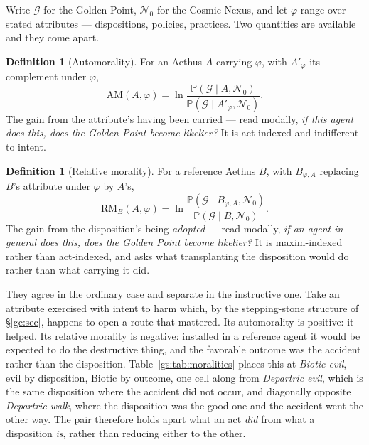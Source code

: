 \documentclass[11pt]{article}
\numberwithin{equation}{section}
\theoremstyle{plain}
\theoremstyle{definition}
\newtheorem{definition}[theorem]{Definition}
\theoremstyle{remark}
\newcommand{\PP}{\mathbb{P}}
\begin{document}
Write $\mathcal G$ for the Golden Point, $\mathcal N_0$ for the Cosmic
Nexus, and let $\varphi$ range over stated attributes --- dispositions,
policies, practices. Two quantities are available and they come apart.

\begin{definition}[Automorality]\label{gs:def:automorality}
For an Aethus $A$ carrying $\varphi$, with $A'_\varphi$ its complement
under $\varphi$,
\begin{equation}\label{gs:eq:am}
\mathrm{AM}(A,\varphi)=
\ln\frac{\PP(\mathcal G\mid A,\mathcal N_0)}
{\PP(\mathcal G\mid A'_\varphi,\mathcal N_0)} .
\end{equation}
The gain from the attribute's having been carried --- read modally,
\emph{if this agent does this, does the Golden Point become likelier?}
It is act-indexed and indifferent to intent.
\end{definition}

\begin{definition}[Relative morality]\label{gs:def:relmorality}
For a reference Aethus $B$, with $B_{\varphi,A}$ replacing $B$'s
attribute under $\varphi$ by $A$'s,
\begin{equation}\label{gs:eq:rm}
\mathrm{RM}_B(A,\varphi)=
\ln\frac{\PP(\mathcal G\mid B_{\varphi,A},\mathcal N_0)}
{\PP(\mathcal G\mid B,\mathcal N_0)} .
\end{equation}
The gain from the disposition's being \emph{adopted} --- read modally,
\emph{if an agent in general does this, does the Golden Point become
likelier?} It is maxim-indexed rather than act-indexed, and asks what
transplanting the disposition would do rather than what carrying it did.
\end{definition}

They agree in the ordinary case and separate in the instructive one. Take
an attribute exercised with intent to harm which, by the stepping-stone
structure of \S\ref{gc:sec}, happens to open a route that mattered. Its
automorality is positive: it helped. Its relative morality is negative:
installed in a reference agent it would be expected to do the destructive
thing, and the favorable outcome was the accident rather than the
disposition. Table~\ref{gs:tab:moralities} places this at \emph{Biotic evil}, evil
by disposition, Biotic by outcome, one cell along from \emph{Departric
evil}, which is the same disposition where the accident did not occur,
and diagonally opposite \emph{Departric walk}, where the disposition was
the good one and the accident went the other way. The pair therefore holds apart what an act \emph{did} from
what a disposition \emph{is}, rather than reducing either to the other.
\end{document}
